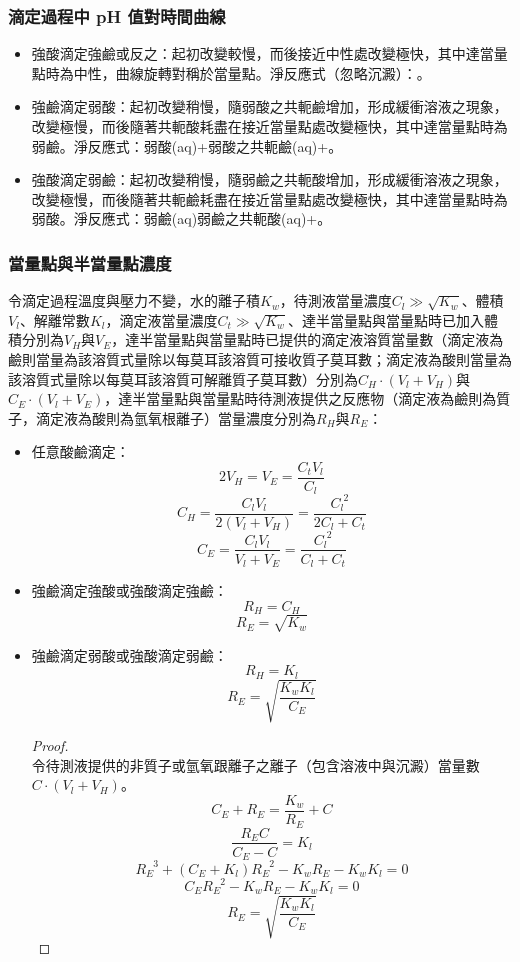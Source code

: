 \documentclass[a4paper,12pt]{article}
\begin{document}
\subsubsection{滴定過程中 pH 值對時間曲線}
\begin{itemize}
\item 強酸滴定強鹼或反之：起初改變較慢，而後接近中性處改變極快，其中達當量點時為中性，曲線旋轉對稱於當量點。淨反應式（忽略沉澱）：。
\item 強鹼滴定弱酸：起初改變稍慢，隨弱酸之共軛鹼增加，形成緩衝溶液之現象，改變極慢，而後隨著共軛酸耗盡在接近當量點處改變極快，其中達當量點時為弱鹼。淨反應式：弱酸(aq)+弱酸之共軛鹼(aq)+。
\item 強酸滴定弱鹼：起初改變稍慢，隨弱鹼之共軛酸增加，形成緩衝溶液之現象，改變極慢，而後隨著共軛鹼耗盡在接近當量點處改變極快，其中達當量點時為弱酸。淨反應式：弱鹼(aq)\ce{->}弱鹼之共軛酸(aq)+。
\end{itemize}
\subsubsection{當量點與半當量點濃度}
令滴定過程溫度與壓力不變，水的離子積$K_w$，待測液當量濃度$C_l\gg\sqrt{K_w}$、體積$V_l$、解離常數$K_l$，滴定液當量濃度$C_t\gg\sqrt{K_w}$、達半當量點與當量點時已加入體積分別為$V_H$與$V_E$，達半當量點與當量點時已提供的滴定液溶質當量數（滴定液為鹼則當量為該溶質式量除以每莫耳該溶質可接收質子莫耳數；滴定液為酸則當量為該溶質式量除以每莫耳該溶質可解離質子莫耳數）分別為$C_H\cdot (V_l+V_H)$與$C_E\cdot (V_l+V_E)$，達半當量點與當量點時待測液提供之反應物（滴定液為鹼則為質子，滴定液為酸則為氫氧根離子）當量濃度分別為$R_H$與$R_E$：
\begin{itemize}
\item 任意酸鹼滴定：
\[2V_H=V_E=\frac{C_tV_l}{C_l}\]
\[C_H=\frac{C_lV_l}{2(V_l+V_H)}=\frac{C_l^{\phantom{l}2}}{2C_l+C_t}\]
\[C_E=\frac{C_lV_l}{V_l+V_E}=\frac{C_l^{\phantom{l}2}}{C_l+C_t}\]
\item 強鹼滴定強酸或強酸滴定強鹼：
\[R_H=C_H\]
\[R_E=\sqrt{K_w}\]
\item 強鹼滴定弱酸或強酸滴定弱鹼：
\[R_H=K_l\]
\[R_E=\sqrt{\frac{K_wK_l}{C_E}}\]
\begin{proof}\mbox{}\\
令待測液提供的非質子或氫氧跟離子之離子（包含溶液中與沉澱）當量數$C\cdot (V_l+V_H)$。
\[C_E+R_E=\frac{K_w}{R_E}+C\]
\[\frac{R_EC}{C_E-C}=K_l\]
\[R_E^{\phantom{E}3}+(C_E+K_l)R_E^{\phantom{E}2}-K_wR_E-K_wK_l=0\]
\[C_ER_E^{\phantom{E}2}-K_wR_E-K_wK_l=0\]
\[R_E=\sqrt{\frac{K_wK_l}{C_E}}\]
\end{proof}
\end{itemize}
\end{document}
